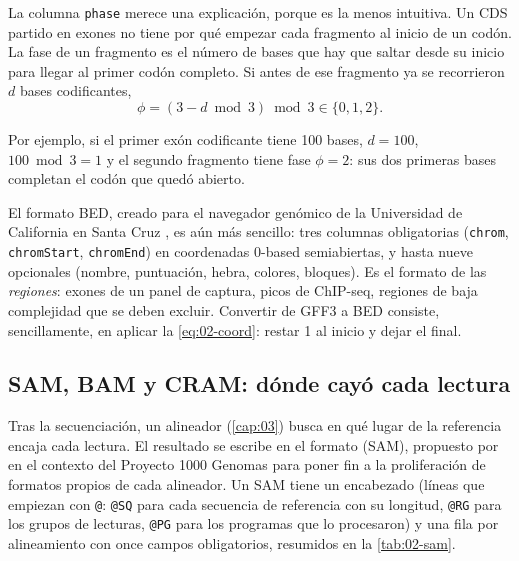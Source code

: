 La columna \texttt{phase} merece una explicación, porque es la menos intuitiva. Un CDS partido en exones no tiene por qué empezar cada fragmento al inicio de un codón. La fase de un fragmento es el número de bases que hay que saltar desde su inicio para llegar al primer codón completo. Si antes de ese fragmento ya se recorrieron $d$ bases codificantes,
\begin{equation}\label{eq:02-fase}
\phi = (3 - d \bmod 3) \bmod 3 \in \{0, 1, 2\}.
\end{equation}
\begin{simbolos}
\end{simbolos}
Por ejemplo, si el primer exón codificante tiene 100 bases, $d=100$, $100 \bmod 3 = 1$ y el segundo fragmento tiene fase $\phi=2$: sus dos primeras bases completan el codón que quedó abierto.

El formato BED, creado para el navegador genómico de la Universidad de California en Santa Cruz \parencite{c02-kent2002}, es aún más sencillo: tres columnas obligatorias (\texttt{chrom}, \texttt{chromStart}, \texttt{chromEnd}) en coordenadas 0-based semiabiertas, y hasta nueve opcionales (nombre, puntuación, hebra, colores, bloques). Es el formato de las \emph{regiones}: exones de un panel de captura, picos de ChIP-seq, regiones de baja complejidad que se deben excluir. Convertir de GFF3 a BED consiste, sencillamente, en aplicar la \cref{eq:02-coord}: restar 1 al inicio y dejar el final.

\subsection{SAM, BAM y CRAM: dónde cayó cada lectura}

Tras la secuenciación, un alineador (\cref{cap:03}) busca en qué lugar de la referencia encaja cada lectura. El resultado se escribe en el formato  (SAM), propuesto por \textcite{c02-li2009} en el contexto del Proyecto 1000 Genomas para poner fin a la proliferación de formatos propios de cada alineador. Un SAM tiene un encabezado (líneas que empiezan con \texttt{@}: \texttt{@SQ} para cada secuencia de referencia con su longitud, \texttt{@RG} para los grupos de lecturas, \texttt{@PG} para los programas que lo procesaron) y una fila por alineamiento con once campos obligatorios, resumidos en la \cref{tab:02-sam}.

